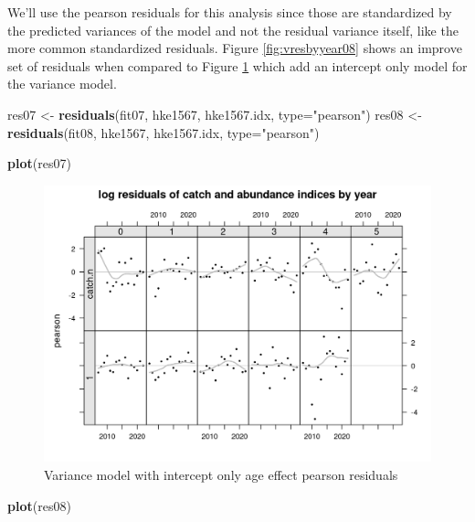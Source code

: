 \documentclass[
]{book}
\newenvironment{Shaded}{\begin{snugshade}}{\end{snugshade}}
\newcommand{\AttributeTok}[1]{\textcolor[rgb]{0.13,0.29,0.53}{#1}}
\newcommand{\FunctionTok}[1]{\textcolor[rgb]{0.13,0.29,0.53}{\textbf{#1}}}
\newcommand{\NormalTok}[1]{#1}
\newcommand{\OtherTok}[1]{\textcolor[rgb]{0.56,0.35,0.01}{#1}}
\newcommand{\StringTok}[1]{\textcolor[rgb]{0.31,0.60,0.02}{#1}}
\begin{document}
We'll use the pearson residuals for this analysis since those are standardized by the predicted variances of the model and not the residual variance itself, like the more common standardized residuals. Figure \ref{fig:vresbyyear08} shows an improve set of residuals when compared to Figure \ref{fig:vresbyyear07} which add an intercept only model for the variance model.

\begin{Shaded}
\begin{Highlighting}[]
\NormalTok{res07 }\OtherTok{\textless{}{-}} \FunctionTok{residuals}\NormalTok{(fit07, hke1567, hke1567.idx, }\AttributeTok{type=}\StringTok{"pearson"}\NormalTok{)}
\NormalTok{res08 }\OtherTok{\textless{}{-}} \FunctionTok{residuals}\NormalTok{(fit08, hke1567, hke1567.idx, }\AttributeTok{type=}\StringTok{"pearson"}\NormalTok{)}
\end{Highlighting}
\end{Shaded}

\begin{Shaded}
\begin{Highlighting}[]
\FunctionTok{plot}\NormalTok{(res07)}
\end{Highlighting}
\end{Shaded}

\begin{figure}
\centering
\includegraphics{_bookdown_files/_main_files/figure-html/vresbyyear07-1.png}
\caption{\label{fig:vresbyyear07}Variance model with intercept only age effect pearson residuals}
\end{figure}

\begin{Shaded}
\begin{Highlighting}[]
\FunctionTok{plot}\NormalTok{(res08)}
\end{Highlighting}
\end{Shaded}
\end{document}
